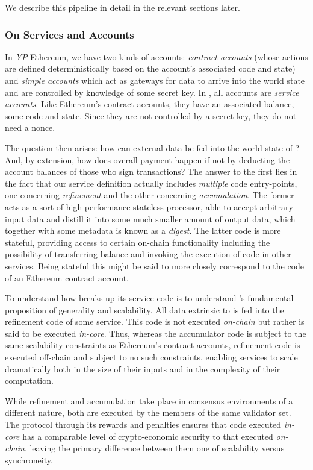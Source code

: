 We describe this pipeline in detail in the relevant sections later.

\subsubsection{On Services and Accounts}

In \emph{YP} Ethereum, we have two kinds of accounts: \emph{contract accounts} (whose actions are defined deterministically based on the account's associated code and state) and \emph{simple accounts} which act as gateways for data to arrive into the world state and are controlled by knowledge of some secret key. In \Jam, all accounts are \emph{service accounts}. Like Ethereum's contract accounts, they have an associated balance, some code and state. Since they are not controlled by a secret key, they do not need a nonce.

The question then arises: how can external data be fed into the world state of \Jam? And, by extension, how does overall payment happen if not by deducting the account balances of those who sign transactions? The answer to the first lies in the fact that our service definition actually includes \emph{multiple} code entry-points, one concerning \emph{refinement} and the other concerning \emph{accumulation}. The former acts as a sort of high-performance stateless processor, able to accept arbitrary input data and distill it into some much smaller amount of output data, which together with some metadata is known as a \emph{digest}. The latter code is more stateful, providing access to certain on-chain functionality including the possibility of transferring balance and invoking the execution of code in other services. Being stateful this might be said to more closely correspond to the code of an Ethereum contract account.

To understand how \Jam breaks up its service code is to understand \Jam's fundamental proposition of generality and scalability. All data extrinsic to \Jam is fed into the refinement code of some service. This code is not executed \emph{on-chain} but rather is said to be executed \emph{in-core}. Thus, whereas the accumulator code is subject to the same scalability constraints as Ethereum's contract accounts, refinement code is executed off-chain and subject to no such constraints, enabling \Jam services to scale dramatically both in the size of their inputs and in the complexity of their computation.

While refinement and accumulation take place in consensus environments of a different nature, both are executed by the members of the same validator set. The \Jam protocol through its rewards and penalties ensures that code executed \emph{in-core} has a comparable level of crypto-economic security to that executed \emph{on-chain}, leaving the primary difference between them one of scalability versus synchroneity.

